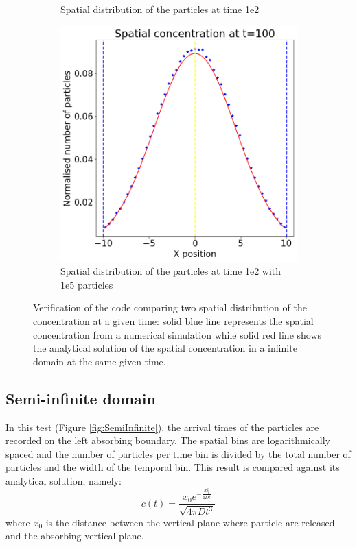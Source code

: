 \documentclass{article}
\begin{document}
\begin{figure}[htbp]
\begin{subfigure}[b]{0.3\textwidth}
        \caption{Spatial distribution of the particles at time 1e2}
        \label{fig:subplotVerInf}
    \end{subfigure}
    \hfill
    \begin{subfigure}[b]{0.3\textwidth}
        \centering
        \includegraphics[width=\textwidth]{images/verificationInfinite1e6.png} %
        \caption{Spatial distribution of the particles at time 1e2 with 1e5 particles}
        \label{fig:subplotVerInf1e5}
    \end{subfigure}
    \caption{Verification of the code comparing two spatial distribution of the concentration at a given time: solid blue line represents the spatial concentration from a numerical simulation while solid red line shows the analytical solution of the spatial concentration in a infinite domain at the same given time.}
    \label{fig:Infinite}
\end{figure}

\subsection{Semi-infinite domain}
In this test (Figure \ref{fig:SemiInfinite}), the arrival times of the particles are recorded on the left absorbing boundary. The spatial bins are logarithmically spaced and the number of particles per time bin is divided by the total number of particles and the width of the temporal bin. This result is compared against its analytical solution, namely:
\begin{equation}
        c(t) = \frac{x_0 e^{-\frac{x_0^2}{4 D t}}}{\sqrt{4 \pi D t^3}}
\end{equation}
where $x_0$ is the distance between the vertical plane where particle are released and the absorbing vertical plane.
\end{document}
